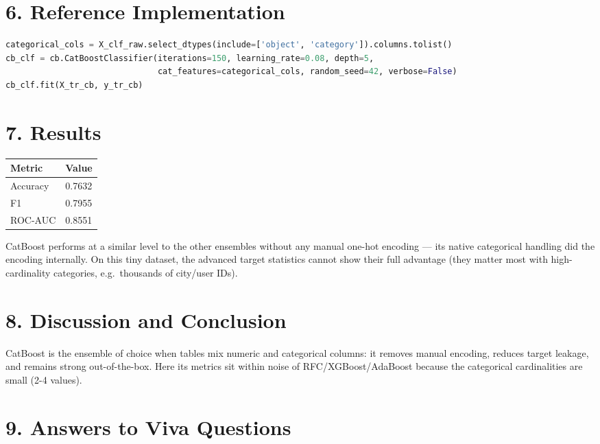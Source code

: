\section{6. Reference Implementation}\label{reference-implementation-4}

\begin{lstlisting}[language=Python]
categorical_cols = X_clf_raw.select_dtypes(include=['object', 'category']).columns.tolist()
cb_clf = cb.CatBoostClassifier(iterations=150, learning_rate=0.08, depth=5,
                               cat_features=categorical_cols, random_seed=42, verbose=False)
cb_clf.fit(X_tr_cb, y_tr_cb)
\end{lstlisting}

\section{7. Results}\label{results-4}

{\def\LTcaptype{none} %
\begin{longtable}[]{@{}ll@{}}
\toprule\noalign{}
Metric & Value \\
\midrule\noalign{}
\endhead
\bottomrule\noalign{}
\endlastfoot
Accuracy & 0.7632 \\
F1 & 0.7955 \\
ROC-AUC & 0.8551 \\
\end{longtable}
}

CatBoost performs at a similar level to the other ensembles without any
manual one-hot encoding --- its native categorical handling did the
encoding internally. On this tiny dataset, the advanced target
statistics cannot show their full advantage (they matter most with
high-cardinality categories, e.g.~thousands of city/user IDs).

\section{8. Discussion and
Conclusion}\label{discussion-and-conclusion-4}

CatBoost is the ensemble of choice when tables mix numeric and
categorical columns: it removes manual encoding, reduces target leakage,
and remains strong out-of-the-box. Here its metrics sit within noise of
RFC/XGBoost/AdaBoost because the categorical cardinalities are small
(2-4 values).

\section{9. Answers to Viva
Questions}\label{answers-to-viva-questions-4}

